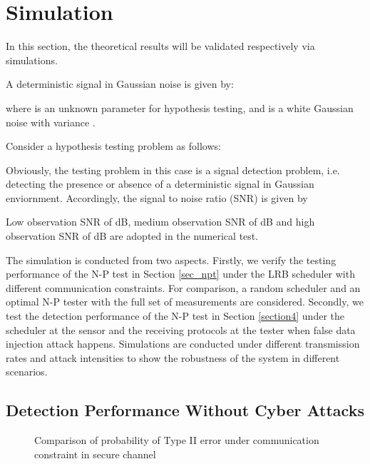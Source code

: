 \documentclass[journal]{IEEEtran}
\begin{document}
\section{Simulation}
In this section, the theoretical results will be validated respectively via simulations.

A deterministic signal in Gaussian noise is given by:

where  is an unknown parameter for hypothesis testing, and  is a white Gaussian noise with variance .

Consider a hypothesis testing problem as follows:


Obviously, the testing problem in this case is a signal detection problem, i.e. detecting the presence or absence of a deterministic signal in Gaussian enviornment. Accordingly, the signal to noise ratio (SNR) is given by

Low observation SNR of  dB,  medium observation SNR of  dB and high observation SNR of  dB are adopted in the numerical test.

The simulation is conducted from two aspects. Firstly, we verify the testing performance of the N-P test in Section \ref{sec_npt} under  the LRB scheduler with different communication constraints. For comparison, a random scheduler and an optimal N-P tester with the full set of measurements are considered. Secondly, we test the detection performance of the N-P test in Section \ref{section4} under the scheduler at the sensor and the  receiving protocols at the tester when false data injection attack happens.  Simulations are conducted under different transmission rates and attack intensities to show the robustness of the system in different scenarios.

\subsection{Detection Performance Without Cyber Attacks}

\begin{figure*}[htbp!]
\centering
{}
\caption{ Comparison of probability of Type II error under communication constraint  in secure channel}
\label{NPsimulation1}
\end{figure*}
\end{document}
